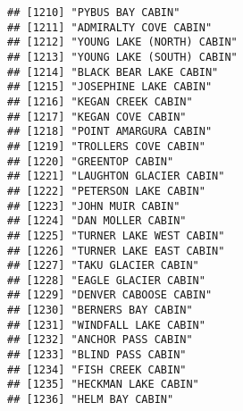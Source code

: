 \documentclass[
]{article}
\begin{document}
\begin{verbatim}
## [1210] "PYBUS BAY CABIN"                                                                     
## [1211] "ADMIRALTY COVE CABIN"                                                                
## [1212] "YOUNG LAKE (NORTH) CABIN"                                                            
## [1213] "YOUNG LAKE (SOUTH) CABIN"                                                            
## [1214] "BLACK BEAR LAKE CABIN"                                                               
## [1215] "JOSEPHINE LAKE CABIN"                                                                
## [1216] "KEGAN CREEK CABIN"                                                                   
## [1217] "KEGAN COVE CABIN"                                                                    
## [1218] "POINT AMARGURA CABIN"                                                                
## [1219] "TROLLERS COVE CABIN"                                                                 
## [1220] "GREENTOP CABIN"                                                                      
## [1221] "LAUGHTON GLACIER CABIN"                                                              
## [1222] "PETERSON LAKE CABIN"                                                                 
## [1223] "JOHN MUIR CABIN"                                                                     
## [1224] "DAN MOLLER CABIN"                                                                    
## [1225] "TURNER LAKE WEST CABIN"                                                              
## [1226] "TURNER LAKE EAST CABIN"                                                              
## [1227] "TAKU GLACIER CABIN"                                                                  
## [1228] "EAGLE GLACIER CABIN"                                                                 
## [1229] "DENVER CABOOSE CABIN"                                                                
## [1230] "BERNERS BAY CABIN"                                                                   
## [1231] "WINDFALL LAKE CABIN"                                                                 
## [1232] "ANCHOR PASS CABIN"                                                                   
## [1233] "BLIND PASS CABIN"                                                                    
## [1234] "FISH CREEK CABIN"                                                                    
## [1235] "HECKMAN LAKE CABIN"                                                                  
## [1236] "HELM BAY CABIN"                                                                      

\end{verbatim}
\end{document}
